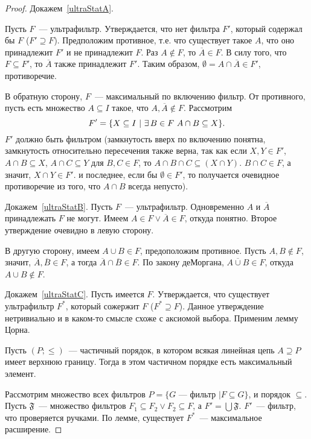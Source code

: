 \begin{proof} Докажем~\ref{ultraStatA}.

	Пусть $F$~— ультрафильтр. Утверждается, что нет фильтра $F'$, который содержал бы $F$ ($F' \supseteq F$). Предположим противное, т.е. что существует такое $A$, что оно принадлежит $F'$ и не принадлежит $F$. Раз $A \notin F$, то $\overline{A} \in F$. В силу того, что $F \subseteq F'$, то $\overline{A}$ также принадлежит $F'$. Таким образом, $\emptyset = A \cap \overline{A} \in F'$, противоречие. 
        
	В обратную сторону, $F$~— максимальный по включению фильтр. От противного, пусть есть множество $A \subseteq I$ такое, что $A, \overline{A} \notin F$. Рассмотрим
	\[ F' = \set*{X \subseteq I\ \middle\vert\ \exists\,B \in F\ A \cap B \subseteq X}. \]
	$F'$ должно быть фильтром (замкнутость вверх по включению понятна, замкнутость относительно пересечения также верна, так как если $X, Y \in F'$, $A \cap B \subseteq X$, $A \cap C \subseteq Y$ для $B, C \in F$, то $A \cap B \cap C \subseteq (X \cap Y)$. $B \cap C \in F$, а значит, $X \cap Y \in F'$. и последнее, если бы $\emptyset \in F'$, то получается очевидное противоречие из того, что $A \cap B$ всегда непусто). 
        
        Докажем~\ref{ultraStatB}. Пусть $F$~— ультрафильтр. Одновременно $A$ и $\overline{A}$ принадлежать $F$ не могут. Имеем $A \in F \vee \overline{A} \in F$, откуда понятно. Второе утверждение очевидно в левую сторону.
        
        В другую сторону, имеем $A \cup B \in F$, предоположим противное. Пусть $A, B \notin F$, значит, $\overline{A}, \overline{B} \in F$, а тогда $\overline{A} \cap \overline{B} \in F$. По закону деМоргана, $\overline{A \cup B} \in F$, откуда $A \cup B \notin F$. 

        Докажем~\ref{ultraStatC}. Пусть имеется $F$. Утверждается, что существует ультрафильтр $F^*$, который сожержит $F$ ($F^* \supseteq F$). Данное утверждение нетривиально и в каком-то смысле схоже с аксиомой выбора. Применим лемму Цорна. 
        
        \begin{lemma}[Цорн]
            Пусть $(P; \leq)$~— частичный порядок, в котором всякая линейная цепь $A \supseteq P$ имеет верхнюю границу. Тогда в этом частичном порядке есть максимальный элемент. 
        \end{lemma} 

        Рассмотрим множество всех фильтров $P = \{G\text{~— фильтр }| F \subseteq G\}$, и порядок $\subseteq$. Пусть $\mathfrak{F}$~— множество фильтров $F_1 \subseteq F_2 \vee F_2 \subseteq F$, а $F' = \bigcup \mathfrak{F}$. $F'$~— фильтр, что проверяется ручками. По лемме, существует $F^*$~— максимальное расширение. 
\end{proof} 

